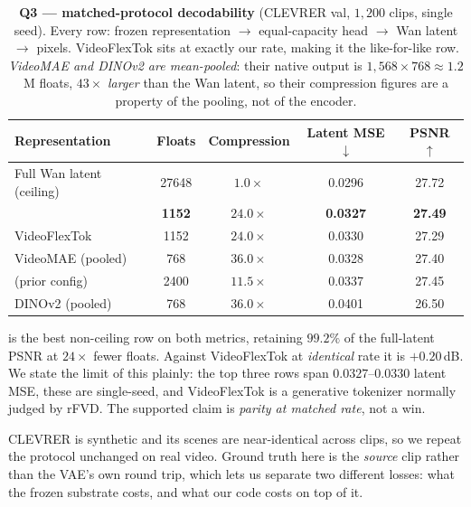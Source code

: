\begin{table}[t]
\centering\small
\caption{\textbf{Q3 --- matched-protocol decodability} (CLEVRER val, $1{,}200$ clips,
single seed). Every row: frozen representation $\to$ equal-capacity head $\to$ Wan
latent $\to$ pixels. VideoFlexTok sits at exactly our rate, making it the like-for-like
row. \emph{VideoMAE and DINOv2 are mean-pooled}: their native output is
$1{,}568\times768\approx1.2$M floats, $43\times$ \emph{larger} than the Wan latent, so
their compression figures are a property of the pooling, not of the encoder.}
\label{tab:matched}
\begin{tabular}{lcccc}
\toprule
Representation & Floats & Compression & Latent MSE $\downarrow$ & PSNR $\uparrow$ \\
\midrule
Full Wan latent (ceiling) & 27648 & $1.0\times$ & 0.0296 & 27.72 \\
\midrule
\textbf{\method{}} & \textbf{1152} & $\mathbf{24.0\times}$ & \textbf{0.0327} & \textbf{27.49} \\
VideoFlexTok \citep{videoflextok} & 1152 & $24.0\times$ & 0.0330 & 27.29 \\
VideoMAE \citep{videomae} (pooled) & 768 & $36.0\times$ & 0.0328 & 27.40 \\
\method{} (prior config) & 2400 & $11.5\times$ & 0.0337 & 27.45 \\
DINOv2 \citep{dinov2} (pooled) & 768 & $36.0\times$ & 0.0401 & 26.50 \\
\bottomrule
\end{tabular}
\end{table}

\method{} is the best non-ceiling row on both metrics, retaining $99.2\%$ of the
full-latent PSNR at $24\times$ fewer floats. Against VideoFlexTok at \emph{identical}
rate it is $+0.20$\,dB. We state the limit of this plainly: the top three rows span
$0.0327$--$0.0330$ latent MSE, these are single-seed, and VideoFlexTok is a generative
tokenizer normally judged by rFVD. The supported claim is \emph{parity at matched rate},
not a win.

CLEVRER is synthetic and its scenes are near-identical across clips, so we repeat the
protocol unchanged on real video. Ground truth here is the \emph{source} clip rather
than the VAE's own round trip, which lets us separate two different losses: what the
frozen substrate costs, and what our code costs on top of it.

